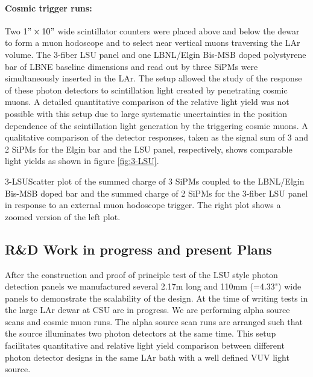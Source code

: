 \paragraph{Cosmic trigger runs:} Two $ 1" \times 10"$ wide scintillator counters were placed above and below the dewar to form a muon hodoscope and to select near vertical muons traversing the LAr volume. The 3-fiber LSU panel and one LBNL/Elgin Bis-MSB doped polystyrene bar of LBNE baseline dimensions and read out by three SiPMs were simultaneously inserted in the LAr. The setup allowed the study of the response of these photon detectors to scintillation light created by penetrating cosmic muons. A detailed quantitative comparison of the relative light yield was not possible with this setup due to large systematic uncertainties in the position dependence of the scintillation light generation by the triggering cosmic muons. A qualitative comparison of the detector responses, taken as the signal sum of 3 and 2 SiPMs for the Elgin bar and the LSU panel, respectively, shows comparable light yields as shown in figure \ref{fig:3-LSU}. 
        
%
%
\begin{cdrfigure}{3-LSU}{Scatter plot of the summed charge of 3 SiPMs coupled to the
 LBNL/Elgin Bis-MSB doped bar and the summed charge of 2 SiPMs for
 the 3-fiber LSU panel in response to an external muon hodoscope
 trigger. The right plot shows a zoomed version of the left plot.}
\end{cdrfigure}

%

\subsection{R\&D Work in progress and present Plans }

After the construction and proof of principle test of the LSU style
photon detection panels we manufactured several 2.17m long and 110mm
(=4.33") wide panels to demonstrate the scalability of the design.  At
the time of writing tests in the large LAr dewar at CSU are in
progress.  We are performing alpha source scans and cosmic muon runs.
The alpha source scan runs are arranged such that the source
illuminates two photon detectors at the same time.  This setup
facilitates quantitative and relative light yield comparison between
different photon detector designs in the same LAr bath with a well
defined VUV light source.

